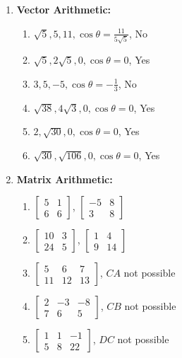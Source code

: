 \begin{multicols}{2}
\begin{enumerate}
\small
\item \textbf{Vector Arithmetic:}
\begin{enumerate}
	\item $\sqrt{5}, 5, 11, \cos\theta = \frac{11}{5\sqrt{5}}$, No
	\item $\sqrt{5}, 2\sqrt{5}, 0, \cos\theta = 0$, Yes
	\item $3, 5, -5, \cos\theta = -\frac{1}{3}$, No
	\item $\sqrt{38}, 4\sqrt{3}, 0, \cos\theta = 0$, Yes
	\item $2, \sqrt{30}, 0, \cos\theta = 0$, Yes
	\item $\sqrt{30}, \sqrt{106}, 0, \cos\theta = 0$, Yes
\end{enumerate}
\item \textbf{Matrix Arithmetic:}
\begin{enumerate}
	\item $ 
\begin{bmatrix}
5 & 1 \\
 6 & 6
\end{bmatrix}
$, $
\begin{bmatrix}
 -5 & 8 \\
 3 & 8
\end{bmatrix}
$
	\item 
$
\begin{bmatrix}
 10 & 3 \\
 24 & 5
\end{bmatrix}
$, 
$
\begin{bmatrix}
 1 & 4 \\
 9 & 14
\end{bmatrix}
$
	\item 
	$
\begin{bmatrix}
 5 & 6 & 7 \\
 11 & 12 & 13
\end{bmatrix}
$, $CA$ not possible
	\item 
	$
\begin{bmatrix}
 2 & -3 & -8 \\
 7 & 6 & 5
\end{bmatrix}
$, $CB$ not possible
	\item 
	$
\begin{bmatrix}
 1 & 1 & -1 \\
 5 & 8 & 22
\end{bmatrix}
$, $DC$ not possible

\end{enumerate}
\end{enumerate}
\end{multicols}
